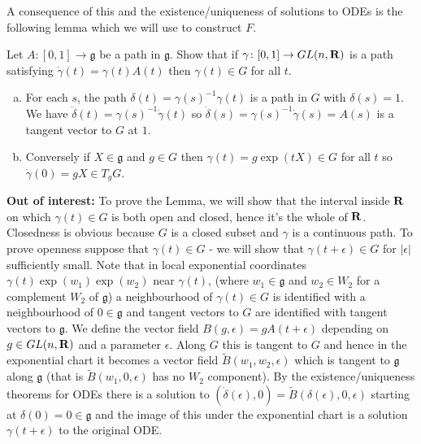 \documentclass[12pt]{article}
\begin{document}
A consequence of this and the existence/uniqueness of solutions to ODEs is the following lemma which we will use to construct $F$.
\begin{lma}
Let $A\colon[0,1]\to\mathfrak{g}$ be a path in $\mathfrak{g}$. Show that if $\gamma\colon[0,1]\to GL(n,\mathbf{R})$ is a path satisfying $\dot{\gamma}(t)=\gamma(t)A(t)$ then $\gamma(t)\in G$ for all $t$.
\end{lma}

\begin{answer}
\begin{enumerate}[(a)]
\item For each $s$, the path $\delta(t)=\gamma(s)^{-1}\gamma(t)$ is a path in $G$ with $\delta(s)=1$. We have $\dot{\delta}(t)=\gamma(s)^{-1}\dot{\gamma}(t)$ so $\dot{\delta}(s)=\gamma(s)^{-1}\dot{\gamma}(s)=A(s)$ is a tangent vector to $G$ at $1$.
\item Conversely if $X\in\mathfrak{g}$ and $g\in G$ then $\gamma(t)=g\exp(tX)\in G$ for all $t$ so $\dot{\gamma}(0)=gX\in T_gG$.
\end{enumerate}

{\small {\bf Out of interest:} To prove the Lemma, we will show that the interval inside $\mathbf{R}$ on which $\gamma(t)\in G$ is both open and closed, hence it's the whole of $\mathbf{R}$. Closedness is obvious because $G$ is a closed subset and $\gamma$ is a continuous path. To prove openness suppose that $\gamma(t)\in G$ - we will show that $\gamma(t+\epsilon)\in G$ for $|\epsilon|$ sufficiently small. Note that in local exponential coordinates $\gamma(t)\exp(w_1)\exp(w_2)$ near $\gamma(t)$, (where $w_1\in\mathfrak{g}$ and $w_2\in W_2$ for a complement $W_2$ of $\mathfrak{g}$) a neighbourhood of $\gamma(t)\in G$ is identified with a neighbourhood of $0\in\mathfrak{g}$ and tangent vectors to $G$ are identified with tangent vectors to $\mathfrak{g}$. We define the vector field $B(g,\epsilon)=gA(t+\epsilon)$ depending on $g\in GL(n,\mathbf{R})$ and a parameter $\epsilon$. Along $G$ this is tangent to $G$ and hence in the exponential chart it becomes a vector field $\tilde{B}(w_1,w_2,\epsilon)$ which is tangent to $\mathfrak{g}$ along $\mathfrak{g}$ (that is $\tilde{B}(w_1,0,\epsilon)$ has no $W_2$ component). By the existence/uniqueness theorems for ODEs there is a solution to $(\dot{\delta}(\epsilon),0)=\tilde{B}(\delta(\epsilon),0,\epsilon)$ starting at $\delta(0)=0\in\mathfrak{g}$ and the image of this under the exponential chart is a solution $\gamma(t+\epsilon)$ to the original ODE.}
\end{answer}
\end{document}
